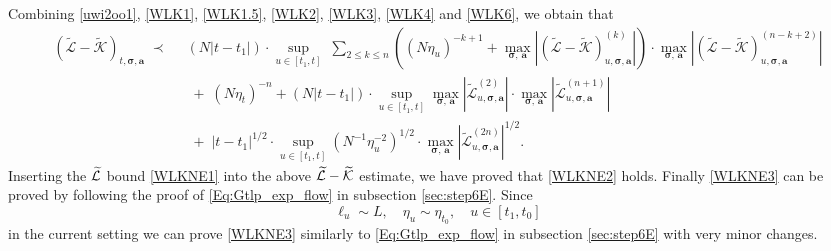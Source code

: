\documentclass[10pt,reqno]{article}
\theoremstyle{plain} %
\theoremstyle{remark}
\numberwithin{equation}{section}
\begin{document}
Combining \eqref{uwi2oo1}, \eqref{WLK1}, \eqref{WLK1.5}, \eqref{WLK2}, \eqref{WLK3}, \eqref{WLK4} and \eqref{WLK6},   we obtain that 
     \begin{align} \nonumber
    (\mathcal{\widetilde{L}} - \mathcal{\widetilde{K}})_{t, \boldsymbol{\sigma}, \textbf{a}} \;\prec \; \; &
     \left(N|t-t_1|\right)\cdot \sup_{u\in [t_1,t]}\;\sum_{2\le k\le n} \left((N\eta_u)^{-k+1}+\max_{\boldsymbol{\sigma}, \,\textbf{a}}   \left|(\mathcal{\widetilde{L}}-\mathcal{\widetilde{K}})^{(k)}_{u, \boldsymbol{\sigma}, \textbf{a}}\right|\right)\cdot \max_{\boldsymbol{\sigma}, \,\textbf{a}}   \left|(\mathcal{\widetilde{L}}-\mathcal{\widetilde{K}})^{(n-k+2)}_{u, \boldsymbol{\sigma}, \textbf{a}}\right| 
    \\\label{WLK9}
    &\;+\;(N\eta_t)^{-n}
    +   \left(N|t-t_1|\right)\cdot \sup_{u\in [t_1,t]} \max_{\boldsymbol{\sigma}, \,\textbf{a}}   \left| \mathcal{\widetilde{L}} ^{(2)}_{u, \boldsymbol{\sigma}, \textbf{a}}\right| \cdot \max_{\boldsymbol{\sigma}, \,\textbf{a}}   \left|\mathcal{\widetilde{L}} ^{(n+1 )} _{u, \boldsymbol{\sigma}, \textbf{a}}\right|
    \\\nonumber
    &\;+\; |t-t_1|^{1/2}\cdot \sup_{u\in [t_1,t]}\left(  N^{-1}\eta_u^{-2}\right)^{1/2} \cdot \max_{\boldsymbol{\sigma}, \,\textbf{a}}   \left|\mathcal{\widetilde{L}} ^{( 2n )} _{u, \boldsymbol{\sigma}, \textbf{a}}\right| ^{1/2}.
    \end{align}  
 Inserting  the $\cal \widetilde{L}$ bound \eqref{WLKNE1} into the above $\cal \widetilde{L}- \cal \widetilde{K}$ estimate, we have proved that  \eqref{WLKNE2} holds. 
Finally  \eqref{WLKNE3} can be proved by following  the proof of \eqref{Eq:Gtlp_exp_flow} in subsection \ref{sec:step6E}. Since    
  $$
  \ell_u\sim L, \quad \eta_u\sim \eta_{t_0}, \quad u\in [t_1,t_0]$$
in the current setting
 we can prove \eqref{WLKNE3} similarly to  \eqref{Eq:Gtlp_exp_flow} in subsection \ref{sec:step6E}  with very minor changes. 
\end{document}
